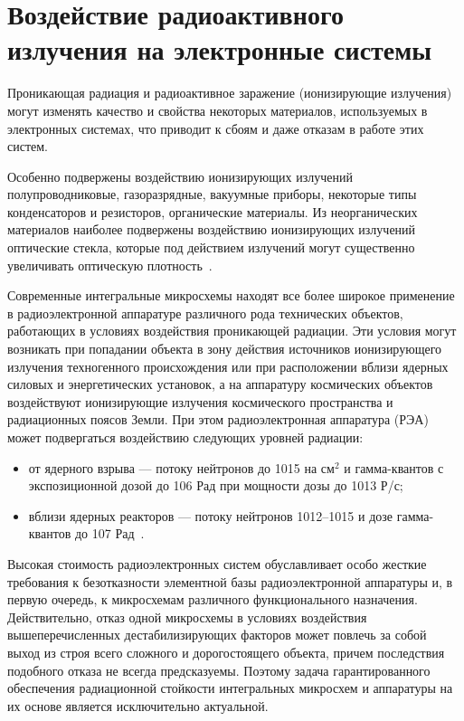 \section{Воздействие радиоактивного излучения на электронные системы}

Проникающая радиация и радиоактивное заражение (ионизирующие излучения) могут изменять качество и свойства некоторых материалов, используемых в электронных системах, что приводит к сбоям и даже отказам в работе этих систем.

Особенно подвержены воздействию ионизирующих излучений полупроводниковые, газоразрядные, вакуумные приборы, некоторые типы конденсаторов и резисторов, органические материалы. Из неорганических материалов наиболее подвержены воздействию ионизирующих излучений оптические стекла, которые под действием излучений могут существенно увеличивать оптическую плотность~\cite{econ1}.

Современные интегральные микросхемы находят все более широкое применение в радиоэлектронной аппаратуре различного рода технических объектов, работающих в условиях воздействия проникающей радиации. Эти условия могут возникать при попадании объекта в зону действия источников ионизирующего излучения техногенного происхождения или при расположении вблизи ядерных силовых и энергетических установок, а на аппаратуру космических объектов воздействуют ионизирующие излучения космического пространства и радиационных поясов Земли. При этом радиоэлектронная аппаратура (РЭА) может подвергаться воздействию следующих уровней радиации:

\begin{itemize}
    \item от ядерного взрыва --- потоку нейтронов до 1015 на $\textrm{см}^2$ и гамма-квантов с экспозиционной дозой до 106 Рад при мощности дозы до 1013 Р/с;
    \item вблизи ядерных реакторов --- потоку нейтронов 1012--1015 и дозе гамма-квантов до 107 Рад~\cite{econ1}.
\end{itemize}

Высокая стоимость радиоэлектронных систем обуславливает особо жесткие требования к безотказности элементной базы радиоэлектронной аппаратуры и, в первую очередь, к микросхемам различного функционального назначения. Действительно, отказ одной микросхемы в условиях воздействия вышеперечисленных дестабилизирующих факторов может повлечь за собой выход из строя всего сложного и дорогостоящего объекта, причем последствия подобного отказа не всегда предсказуемы. Поэтому задача гарантированного обеспечения радиационной стойкости интегральных микросхем и аппаратуры на их основе является исключительно актуальной.

